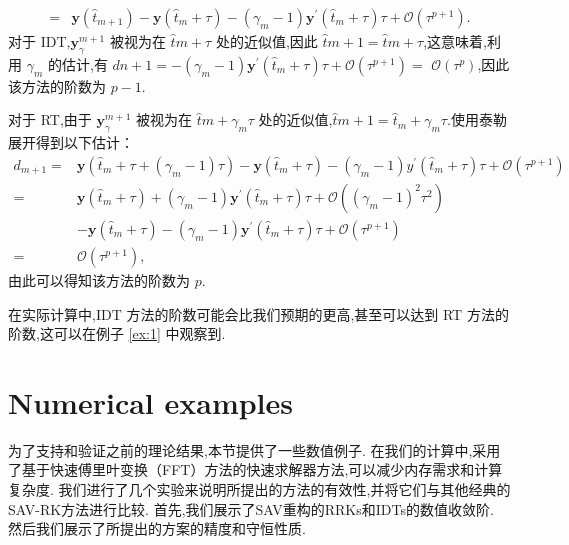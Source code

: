 \begin{pf}
\begin{equation}
\begin{aligned}
		= & \bm{y}\left(\hat{t}_{m+1}\right)-\bm{y}\left(\hat{t}_m+\tau\right)-\left(\gamma_m-1\right) \bm{y}^{\prime}\left(\hat{t}_m+\tau\right) \tau+\mathcal{O}\left(\tau^{p+1}\right) .
		\end{aligned}
		\end{equation}
		对于 IDT,$\bm{y}_\gamma^{m+1}$ 被视为在 $\hat{t}m+\tau$ 处的近似值,因此 $\hat{t}{m+1}=\hat{t}m+\tau$,这意味着,利用 $\gamma_m$ 的估计,有 $d{n+1}=-\left(\gamma_m-1\right) \bm{y}^{\prime}\left(\hat{t}_m+\tau\right) \tau+\mathcal{O}\left(\tau^{p+1}\right)=$ $\mathcal{O}\left(\tau^p\right)$,因此该方法的阶数为 $p-1$.

对于 RT,由于 $\bm{y}_\gamma^{m+1}$ 被视为在 $\hat{t}m+\gamma_m \tau$ 处的近似值,$\hat{t}{m+1}=\hat{t}_m+\gamma_m \tau$.使用泰勒展开得到以下估计：
\begin{equation}
		\begin{aligned}
		d_{m+1}= & \bm{y}\left(\hat{t}_m+\tau+\left(\gamma_m-1\right) \tau\right)-\bm{y}\left(\hat{t}_m+\tau\right)-\left(\gamma_m-1\right) y^{\prime}\left(\hat{t}_m+\tau\right) \tau+\mathcal{O}\left(\tau^{p+1}\right) \\
		= & \bm{y}\left(\hat{t}_m+\tau\right)+\left(\gamma_m-1\right) \bm{y}^{\prime}\left(\hat{t}_m+\tau\right) \tau+\mathcal{O}\left(\left(\gamma_m-1\right)^2 \tau^2\right) \\
		& -\bm{y}\left(\hat{t}_m+\tau\right)-\left(\gamma_m-1\right) \bm{y}^{\prime}\left(\hat{t}_m+\tau\right) \tau+\mathcal{O}\left(\tau^{p+1}\right) \\
		= & \mathcal{O}\left(\tau^{p+1}\right),
		\end{aligned}
\end{equation}
由此可以得知该方法的阶数为 $p$.
\end{pf}
\begin{remark}\label{rk:5_5}
	在实际计算中,IDT 方法的阶数可能会比我们预期的更高,甚至可以达到 RT 方法的阶数,这可以在例子 \ref{ex:1} 中观察到.
\end{remark}

\section{Numerical examples}\label{Section 6}
为了支持和验证之前的理论结果,本节提供了一些数值例子. 在我们的计算中,采用了基于快速傅里叶变换（FFT）方法的快速求解器方法,可以减少内存需求和计算复杂度. 我们进行了几个实验来说明所提出的方法的有效性,并将它们与其他经典的SAV-RK方法进行比较. 首先,我们展示了SAV重构的RRKs和IDTs的数值收敛阶. 然后我们展示了所提出的方案的精度和守恒性质.


